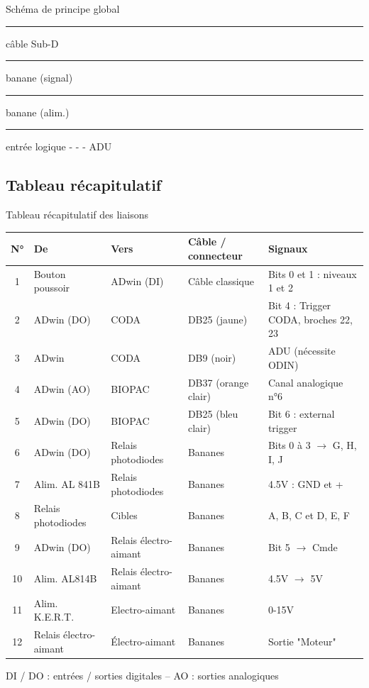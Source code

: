 \documentclass[a4paper,11pt]{beamer}
\begin{document}
\begin{frame}{Schéma de principe global}
\vspace{0.1cm}
\tiny
\textcolor{cSubD}{\rule{4mm}{1pt}} câble Sub-D \quad
\textcolor{cBanane}{\rule{4mm}{1pt}} banane (signal) \quad
\textcolor{cAlim}{\rule{4mm}{1pt}} banane (alim.) \quad
\textcolor{cTTL}{\rule{4mm}{1pt}} entrée logique \quad
\textcolor{cADU}{- - -} ADU
\end{frame}

\subsection{Tableau récapitulatif}
\begin{frame}{Tableau récapitulatif des liaisons}
\centering
\tiny
\setlength{\tabcolsep}{3pt}
\begin{tabular}{clllp{3.6cm}}
	\toprule
	\textbf{N°} & \textbf{De} & \textbf{Vers} & \textbf{Câble / connecteur} & \textbf{Signaux} \\
	\midrule
	1  & Bouton poussoir   & ADwin (DI)          & Câble classique                 & Bits 0 et 1 : niveaux 1 et 2 \\
	2  & ADwin (DO)        & CODA                & DB25 (jaune)        & Bit 4 : Trigger CODA, broches 22, 23 \\
	3  & ADwin             & CODA                & DB9 (noir)          & ADU (nécessite ODIN) \\
	4  & ADwin (AO)        & BIOPAC              & DB37 (orange clair) & Canal analogique n°6 \\
	5  & ADwin (DO)        & BIOPAC              & DB25 (bleu clair)   & Bit 6 : external trigger \\
	6  & ADwin (DO)        & Relais photodiodes  & Bananes             & Bits 0 à 3 $\rightarrow$ G, H, I, J \\
	7  & Alim. AL 841B     & Relais photodiodes  & Bananes             & 4.5V : GND et + \\
	8  & Relais photodiodes& Cibles              & Bananes             & A, B, C et D, E, F \\
	9  & ADwin (DO)        & Relais électro-aimant & Bananes           & Bit 5 $\rightarrow$ Cmde \\
	10 & Alim. AL814B    & Relais électro-aimant & Bananes           & 4.5V $\rightarrow$ 5V \\
	11 & Alim. K.E.R.T.       & Electro-aimant & Bananes           & 0-15V \\
	12 & Relais électro-aimant & Électro-aimant  & Bananes             & Sortie "Moteur" \\
	\bottomrule
\end{tabular}
\vspace{0.3cm}

\scriptsize
DI / DO : entrées / sorties digitales -- AO : sorties analogiques
\end{frame}
\end{document}

